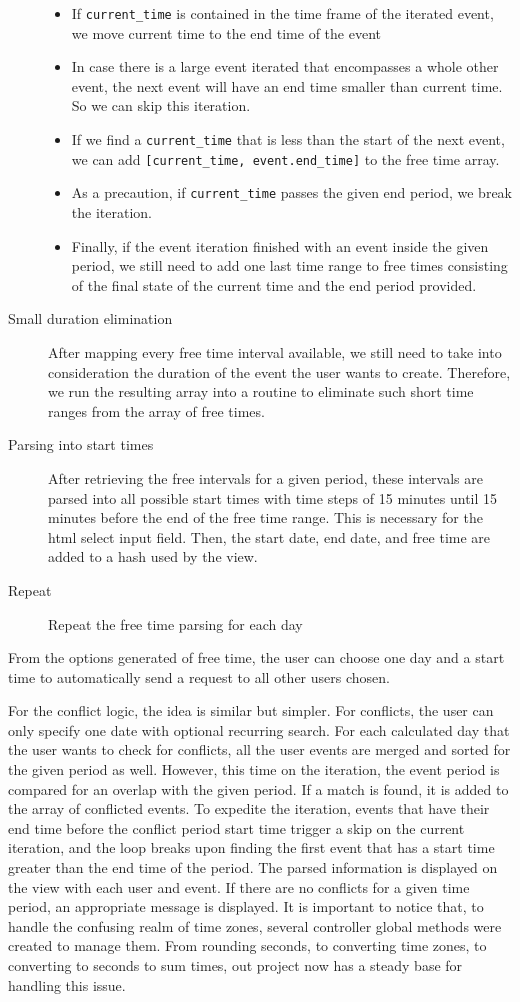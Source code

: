 \documentclass[11pt]{article}
\begin{document}
\begin{description}
\begin{itemize}
\item If \texttt{current_time} is contained in the time frame of the iterated event, we move current time to the end time of the event
\item In case there is a large event iterated that encompasses a whole other event, the next event will have an end time smaller than current time. So we can skip this iteration.
\item If we find a \texttt{current_time} that is less than the start of the next event, we can add \texttt{[current_time, event.end_time]} to the free time array.
\item As a precaution, if \texttt{current_time} passes the given end period, we break the iteration.
\item Finally, if the event iteration finished with an event inside the given period, we still need to add one last time range to free times consisting of the final state of the current time and the end period provided.
\end{itemize}
\item[Small duration elimination] After mapping every free time interval available, we still need to take into consideration the duration of the event the user wants to create. Therefore, we run the resulting array into a routine to eliminate such short time ranges from the array of free times.
\item[Parsing into start times] After retrieving the free intervals for a given period, these intervals are parsed into all possible start times with time steps of 15 minutes until 15 minutes before the end of the free time range. This is necessary for the html select input field. Then, the start date, end date, and free time are added to a hash used by the view.
\item[Repeat] Repeat the free time parsing for each day
\end{description}
From the options generated of free time, the user can choose one day and a start time to automatically send a request to all other users chosen.

For the conflict logic, the idea is similar but simpler. For conflicts, the user can only specify one date with optional recurring search. For each calculated day that the user wants to check for conflicts, all the user events are merged and sorted for the given period as well. However, this time on the iteration, the event period is compared for an overlap with the given period. If a match is found, it is added to the array of conflicted events. To expedite the iteration, events that have their end time before the conflict period start time trigger a skip on the current iteration, and the loop breaks upon finding the first event that has a start time greater than the end time of the period. The parsed information is displayed on the view with each user and event. If there are no conflicts for a given time period, an appropriate message is displayed.
It is important to notice that, to handle the confusing realm of time zones, several controller global methods were created to manage them. From rounding seconds, to converting time zones, to converting to seconds to sum times, out project now has a steady base for handling this issue.
\end{document}
